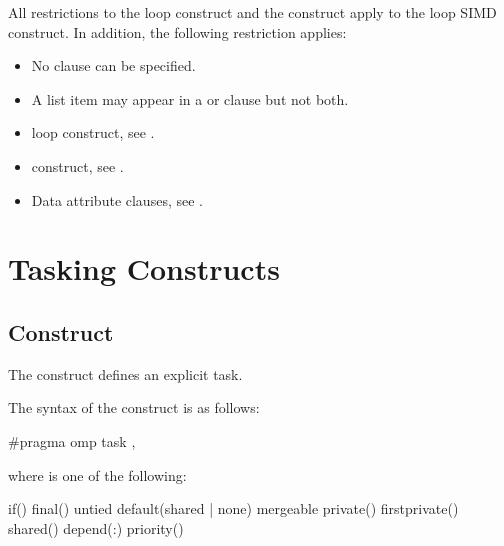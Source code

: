 \restrictions
All restrictions to the loop construct and the  construct apply to the loop SIMD 
construct. In addition, the following restriction applies:

\begin{itemize}
\item No  clause can be specified.
\item A list item may appear in a  or  clause but not both.
\end{itemize}

\begin{samepage}
\crossreferences
\begin{itemize}
\item loop construct, see 
.

\item {} construct, see 
.

\item Data attribute clauses, see 
. 
\end{itemize}
\end{samepage}




\section{Tasking Constructs}
\label{sec:Tasking Constructs}
\subsection{ Construct}
\label{subsec:task Construct}
\summary
The  construct defines an explicit task.

\syntax
\ccppspecificstart
The syntax of the  construct is as follows: 

\begin{boxedcode}
\#pragma omp task \plc{[clause[ [},\plc{] clause] ... ] new-line}
\end{boxedcode}

\begin{samepage}
where  is one of the following: 

\begin{indentedcodelist}
if()
final()
untied
default(shared \textnormal{|} none)
mergeable
private()
firstprivate()
shared()
depend(:)
priority()
\end{indentedcodelist}
\ccppspecificend
\end{samepage}

